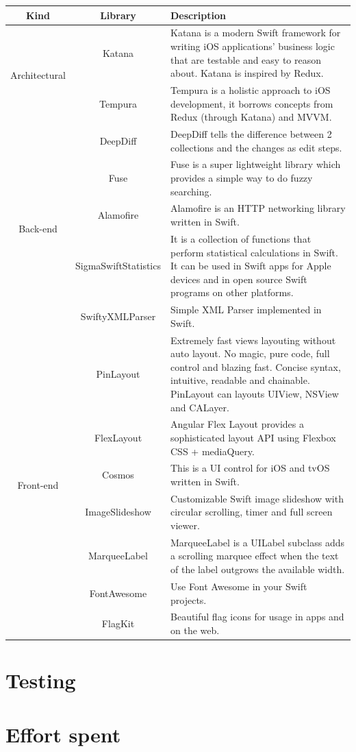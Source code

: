 \documentclass[a4paper, 11pt, parskip=half]{scrreprt}
\theoremstyle{definition}
\begin{document}
\begin{table}[h]
    \centering
    \def\arraystretch{1.3}
    \begin{tabular}{|c|c|m{9cm}|}
        \hline
        \textbf{Kind} & \textbf{Library} & \textbf{Description} \\ \hline
        \multirow{2}{*}{Architectural} & Katana & Katana is a modern Swift framework for writing iOS applications' business logic that are testable and easy to reason about. Katana is inspired by Redux. \\ \cline{2-3}
        & Tempura & Tempura is a holistic approach to iOS development, it borrows concepts from Redux (through Katana) and MVVM. \\ \hline
        \multirow{5}{*}{Back-end} & DeepDiff & DeepDiff tells the difference between 2 collections and the changes as edit steps. \\ \cline{2-3}
        & Fuse & Fuse is a super lightweight library which provides a simple way to do fuzzy searching. \\ \cline{2-3}
        & Alamofire & Alamofire is an HTTP networking library written in Swift. \\ \cline{2-3}
        & SigmaSwiftStatistics & It is a collection of functions that perform statistical calculations in Swift. It can be used in Swift apps for Apple devices and in open source Swift programs on other platforms. \\ \cline{2-3}
        & SwiftyXMLParser & Simple XML Parser implemented in Swift. \\ \hline
        \multirow{7}{*}{Front-end} & PinLayout & Extremely fast views layouting without auto layout. No magic, pure code, full control and blazing fast. Concise syntax, intuitive, readable and chainable. PinLayout can layouts UIView, NSView and CALayer. \\ \cline{2-3}
        & FlexLayout & Angular Flex Layout provides a sophisticated layout API using Flexbox CSS + mediaQuery. \\ \cline{2-3}
        & Cosmos & This is a UI control for iOS and tvOS written in Swift. \\ \cline{2-3}
        & ImageSlideshow & Customizable Swift image slideshow with circular scrolling, timer and full screen viewer. \\ \cline{2-3}
        & MarqueeLabel & MarqueeLabel is a UILabel subclass adds a scrolling marquee effect when the text of the label outgrows the available width. \\ \cline{2-3}
        & FontAwesome & Use Font Awesome in your Swift projects. \\ \cline{2-3}
        & FlagKit & Beautiful flag icons for usage in apps and on the web. \\ \hline
    \end{tabular}
\end{table}



\chapter{Testing}




\chapter{Effort spent}
\end{document}
